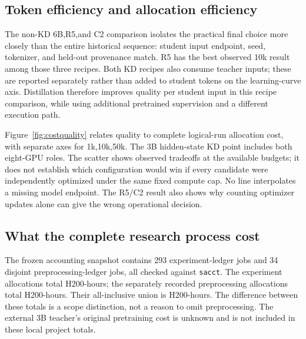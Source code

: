 \subsection{Token efficiency and allocation efficiency}

The non-KD 6B,R5,and C2 comparison isolates the practical final choice more closely than the entire historical sequence: student input endpoint, seed, tokenizer, and held-out provenance match. R5 has the best observed 10k result among those three recipes. Both KD recipes also consume teacher inputs; these are reported separately rather than added to student tokens on the learning-curve axis. Distillation therefore improves quality per student input in this recipe comparison, while using additional pretrained supervision and a different execution path.

Figure~\ref{fig:costquality} relates quality to complete logical-run allocation cost, with separate axes for 1k,10k,50k. The 3B hidden-state KD point includes both eight-GPU roles. The scatter shows observed tradeoffs at the available budgets; it does not establish which configuration would win if every candidate were independently optimized under the same fixed compute cap. No line interpolates a missing model endpoint. The R5/C2 result also shows why counting optimizer updates alone can give the wrong operational decision.


\subsection{What the complete research process cost}

The frozen accounting snapshot contains 293 experiment-ledger jobs and 34 disjoint preprocessing-ledger jobs, all checked against \texttt{sacct}. The experiment allocations total\ExperimentHours{} H200-hours; the separately recorded preprocessing allocations total\PreprocessingHours{} H200-hours. Their all-inclusive union is\CombinedHours{} H200-hours. The difference between these totals is a scope distinction, not a reason to omit preprocessing. The external 3B teacher's original pretraining cost is unknown and is not included in these local project totals.

